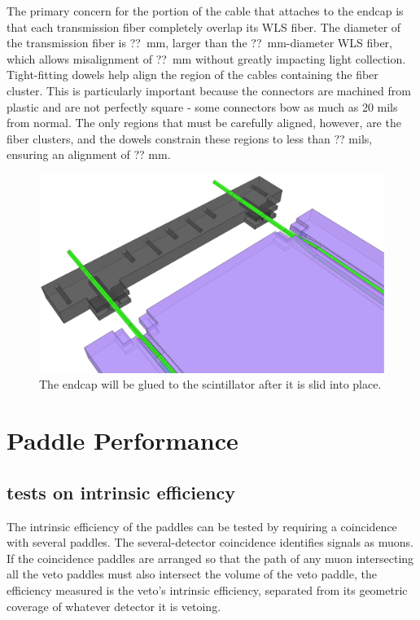 The primary concern for the portion of the cable that attaches to the endcap is that each transmission fiber completely overlap its WLS fiber.  The diameter of the transmission fiber is ??~mm, larger than the ??~mm-diameter WLS fiber, which allows misalignment of ??~mm without greatly impacting light collection.  Tight-fitting dowels help align the region of the cables containing the fiber cluster.  This is particularly important because the connectors are machined from plastic and are not perfectly square - some connectors bow as much as 20 mils from normal.  The only regions that must be carefully aligned, however, are the fiber clusters, and the dowels constrain these regions to less than ?? mils, ensuring an alignment of ?? mm.

\begin{figure}[htp]
\centering
\includegraphics[width=1.0\textwidth]{figures/veto_assembly.eps}
\caption{The endcap will be glued to the scintillator after it is slid into place.}
\label{fig:paddleAssembly}
\end{figure}


\section{Paddle Performance}
\label{sec:singleVeto}

\subsection{tests on intrinsic efficiency}

The intrinsic efficiency of the paddles can be tested by requiring a coincidence with several paddles.  The several-detector coincidence identifies signals as muons.  If the coincidence paddles are arranged so that the path of any muon intersecting all the veto paddles must also intersect the volume of the veto paddle, the efficiency measured is the veto's intrinsic efficiency, separated from its geometric coverage of whatever detector it is vetoing.

